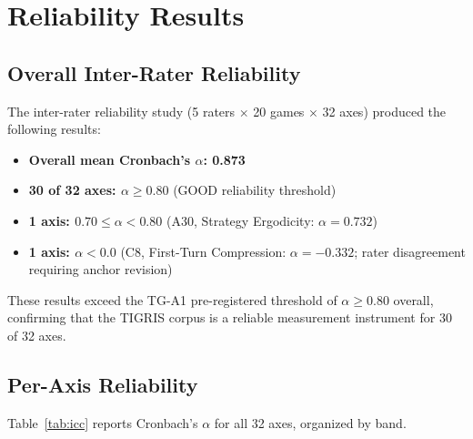 \section{Reliability Results}
\label{sec:results}

\subsection{Overall Inter-Rater Reliability}

The inter-rater reliability study (5 raters $\times$ 20 games $\times$ 32 axes)
produced the following results:

\begin{itemize}
  \item \textbf{Overall mean Cronbach's $\alpha$: 0.873}
  \item \textbf{30 of 32 axes: $\alpha \geq 0.80$} (GOOD reliability threshold)
  \item \textbf{1 axis: $0.70 \leq \alpha < 0.80$} (A30, Strategy Ergodicity: $\alpha = 0.732$)
  \item \textbf{1 axis: $\alpha < 0.0$} (C8, First-Turn Compression: $\alpha = -0.332$; rater disagreement requiring anchor revision)
\end{itemize}

These results exceed the TG-A1 pre-registered threshold of $\alpha \geq 0.80$ overall,
confirming that the TIGRIS corpus is a reliable measurement instrument for 30 of 32 axes.

\subsection{Per-Axis Reliability}

Table~\ref{tab:icc} reports Cronbach's $\alpha$ for all 32 axes, organized by band.

